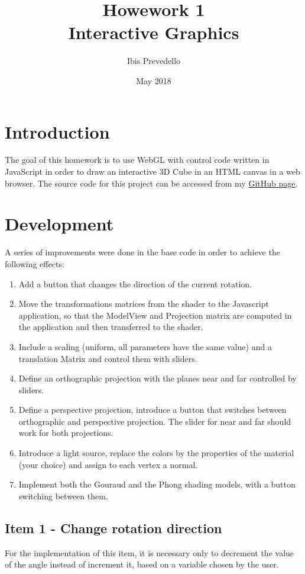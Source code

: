 \documentclass{article}
\title{%
Howework 1 \\
\large Interactive Graphics}
\date{May 2018}
\author{Ibis Prevedello}
\begin{document}
\maketitle

\section{Introduction}
The goal of this homework is to use WebGL with control code written in JavaScript in order to draw an interactive 3D Cube in an HTML canvas in a web browser. The source code for this project can be accessed from my \href{https://github.com/ibiscp/Computer-Graphics-WebGL}{GitHub page}.

\section{Development}
A series of improvements were done in the base code in order to achieve the following effects:

\begin{enumerate}
\item Add a button that changes the direction of the current rotation.
\item Move the transformations matrices from the shader to the Javascript application, so that the ModelView and Projection matrix are computed in the application and then transferred to the shader.
\item Include a scaling (uniform, all parameters have the same value) and a translation Matrix and control them with sliders.
\item Define an orthographic projection with the planes near and far controlled by sliders.
\item Define a perspective projection, introduce a button that switches between orthographic and perspective projection. The slider for near and far should work for both projections.
\item Introduce a light source, replace the colors by the properties of the material (your choice) and assign to each vertex a normal.
\item Implement both the Gouraud and the Phong shading models, with a button switching between them.
\end{enumerate}

\subsection {Item 1 - Change rotation direction}
For the implementation of this item, it is necessary only to decrement the value of the angle instead of increment it, based on a variable chosen by the user.
\end{document}
